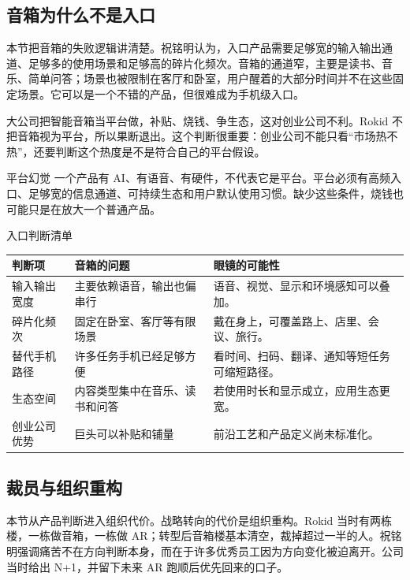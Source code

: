 \documentclass[a4paper]{article}
\begin{document}
\subsection{音箱为什么不是入口}

本节把音箱的失败逻辑讲清楚。祝铭明认为，入口产品需要足够宽的输入输出通道、足够多的使用场景和足够高的碎片化频次。音箱的通道窄，主要是读书、音乐、简单问答；场景也被限制在客厅和卧室，用户醒着的大部分时间并不在这些固定场景。它可以是一个不错的产品，但很难成为手机级入口。

大公司把智能音箱当平台做，补贴、烧钱、争生态，这对创业公司不利。Rokid 不把音箱视为平台，所以果断退出。这个判断很重要：创业公司不能只看“市场热不热”，还要判断这个热度是不是符合自己的平台假设。

\begin{warningbox}{平台幻觉}
一个产品有 AI、有语音、有硬件，不代表它是平台。平台必须有高频入口、足够宽的信息通道、可持续生态和用户默认使用习惯。缺少这些条件，烧钱也可能只是在放大一个普通产品。
\end{warningbox}

\begin{knowledgebox}{入口判断清单}
\noindent\begin{tabularx}{\textwidth}{p{}p{}X}
\toprule
判断项 & 音箱的问题 & 眼镜的可能性 \\
\midrule
输入输出宽度 & 主要依赖语音，输出也偏串行 & 语音、视觉、显示和环境感知可以叠加。 \\
碎片化频次 & 固定在卧室、客厅等有限场景 & 戴在身上，可覆盖路上、店里、会议、旅行。 \\
替代手机路径 & 许多任务手机已经足够方便 & 看时间、扫码、翻译、通知等短任务可缩短路径。 \\
生态空间 & 内容类型集中在音乐、读书和问答 & 若使用时长和显示成立，应用生态更宽。 \\
创业公司优势 & 巨头可以补贴和铺量 & 前沿工艺和产品定义尚未标准化。 \\
\bottomrule
\end{tabularx}
\end{knowledgebox}

\subsection{裁员与组织重构}

本节从产品判断进入组织代价。战略转向的代价是组织重构。Rokid 当时有两栋楼，一栋做音箱，一栋做 AR；转型后音箱楼基本清空，裁掉超过一半的人。祝铭明强调痛苦不在方向判断本身，而在于许多优秀员工因为方向变化被迫离开。公司当时给出 N+1，并留下未来 AR 跑顺后优先回来的口子。
\end{document}
